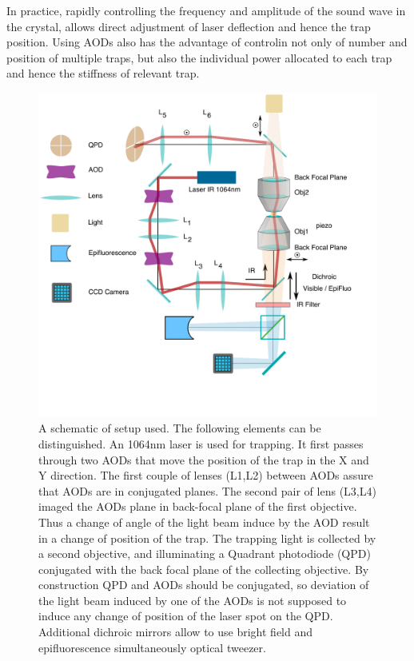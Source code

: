 \documentclass[A4paperpaper,11pt,english]{sphinxmanual}
\begin{document}
In practice, rapidly controlling the frequency and amplitude of the sound wave
in the crystal, allows direct adjustment of laser deflection and hence the
trap position.  Using AODs also has the advantage of controlin not only
of number and position of multiple traps, but also the individual power
allocated to each trap and hence the stiffness of relevant trap.
\begin{figure}[htbp]
\centering
\capstart

\includegraphics[width=0.900\linewidth]{setup-plus-1.png}
\caption{A schematic of  setup used. The following elements can be distinguished. An
1064nm laser is used for trapping. It first passes through two AODs that
move the position of the trap in the X  and Y direction.  The first couple
of lenses (L1,L2) between AODs assure that AODs are in conjugated planes.
The second pair of lens (L3,L4) imaged the AODs plane in back-focal plane
of the first objective.
Thus a change of angle of the light beam induce by the AOD
result in a  change of position of the trap.  The trapping light
is collected by a second objective, and illuminating a Quadrant photodiode
(QPD) conjugated with the back focal plane of the collecting objective. By
construction QPD and AODs should be conjugated, so deviation of the light
beam induced by one of the AODs is not supposed to induce any change of
position of the laser spot on the QPD. Additional dichroic mirrors allow to
use bright field and epifluorescence simultaneously optical
tweezer.}\label{parts/part1:ots}\end{figure}
\end{document}
